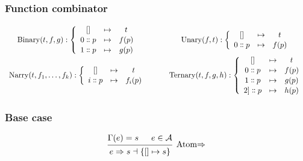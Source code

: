 \documentclass{article}
\DeclareMathOperator{\Binary}{Binary}
\DeclareMathOperator{\Unary}{Unary}
\DeclareMathOperator{\Ternary}{Ternary}
\DeclareMathOperator{\Narry}{Narry}
\renewcommand{\S}{\ensuremath{\Rightarrow}}
\newcommand{\s}[3]{#1 \S{} #2 \dashv{} #3}
\begin{document}
\subsubsection*{Function combinator}
\begin{equation*}
    \renewcommand\arraystretch{1.1}
    \begin{array}{ccc}
        \Binary(t, f, g) : \left\{
        \begin{array}{ccc}
            {[]}               & \mapsto & t     \\
            0 \dblcolon p  & \mapsto & f (p) \\
            1 \dblcolon p & \mapsto & g (p)
        \end{array}
        \right.
         & \hspace{1em} &
        \Unary(f, t) : \left\{
        \begin{array}{ccc}
            {[]}             & \mapsto & t     \\
            0 \dblcolon p & \mapsto & f (p)
        \end{array}
        \right.
        \\
        \Narry(t, f_1, \dots, f_k) : \left\{
        \begin{array}{ccc}
            {[]}                 & \mapsto & t       \\
            i \dblcolon p & \mapsto & f_i (p)
        \end{array}
        \right.
         & \hspace{1em} &
        \Ternary(t, f, g, h) : \left\{
        \begin{array}{ccc}
            {[]}               & \mapsto & t     \\
            0 \dblcolon p   & \mapsto & f (p) \\
            1 \dblcolon p  & \mapsto & g (p) \\
            2] \dblcolon p & \mapsto & h (p)
        \end{array}
        \right.
    \end{array}
\end{equation*}

\subsubsection*{Base case}

\begin{equation*}
    \begin{prooftree}
        \hypo{\Gamma(e) = s}
        \hypo{e \in \mathcal{A}}
        \infer2[Atom\S]{\s{e}{s}{\{[]\mapsto s\}}}
    \end{prooftree}
\end{equation*}
\end{document}
